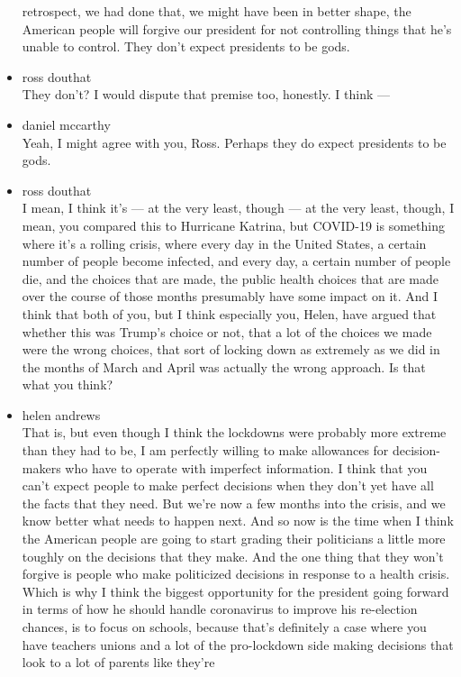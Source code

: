 \begin{itemize}
  retrospect, we had done that, we might have been in better shape, the
  American people will forgive our president for not controlling things
  that he's unable to control. They don't expect presidents to be gods.
\item
  ross douthat\\
  They don't? I would dispute that premise too, honestly. I think ---
\item
  daniel mccarthy\\
  Yeah, I might agree with you, Ross. Perhaps they do expect presidents
  to be gods.
\item
  ross douthat\\
  I mean, I think it's --- at the very least, though --- at the very
  least, though, I mean, you compared this to Hurricane Katrina, but
  COVID-19 is something where it's a rolling crisis, where every day in
  the United States, a certain number of people become infected, and
  every day, a certain number of people die, and the choices that are
  made, the public health choices that are made over the course of those
  months presumably have some impact on it. And I think that both of
  you, but I think especially you, Helen, have argued that whether this
  was Trump's choice or not, that a lot of the choices we made were the
  wrong choices, that sort of locking down as extremely as we did in the
  months of March and April was actually the wrong approach. Is that
  what you think?
\item
  helen andrews\\
  That is, but even though I think the lockdowns were probably more
  extreme than they had to be, I am perfectly willing to make allowances
  for decision-makers who have to operate with imperfect information. I
  think that you can't expect people to make perfect decisions when they
  don't yet have all the facts that they need. But we're now a few
  months into the crisis, and we know better what needs to happen next.
  And so now is the time when I think the American people are going to
  start grading their politicians a little more toughly on the decisions
  that they make. And the one thing that they won't forgive is people
  who make politicized decisions in response to a health crisis. Which
  is why I think the biggest opportunity for the president going forward
  in terms of how he should handle coronavirus to improve his
  re-election chances, is to focus on schools, because that's definitely
  a case where you have teachers unions and a lot of the pro-lockdown
  side making decisions that look to a lot of parents like they're

\end{itemize}
